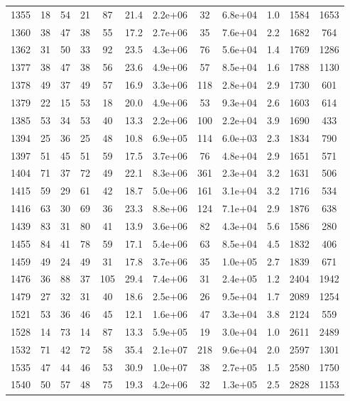 \begin{table}
\begin{tabular}{cccccccccccc}
1355 & 18 & 54 & 21 & 87 & 21.4 & 2.2e+06 & 32 & 6.8e+04 & 1.0 & 1584 & 1653 \\
1360 & 38 & 47 & 38 & 55 & 17.2 & 2.7e+06 & 35 & 7.6e+04 & 2.2 & 1682 & 764 \\
1362 & 31 & 50 & 33 & 92 & 23.5 & 4.3e+06 & 76 & 5.6e+04 & 1.4 & 1769 & 1286 \\
1377 & 38 & 47 & 38 & 56 & 23.6 & 4.9e+06 & 57 & 8.5e+04 & 1.6 & 1788 & 1130 \\
1378 & 49 & 37 & 49 & 57 & 16.9 & 3.3e+06 & 118 & 2.8e+04 & 2.9 & 1730 & 601 \\
1379 & 22 & 15 & 53 & 18 & 20.0 & 4.9e+06 & 53 & 9.3e+04 & 2.6 & 1603 & 614 \\
1385 & 53 & 34 & 53 & 40 & 13.3 & 2.2e+06 & 100 & 2.2e+04 & 3.9 & 1690 & 433 \\
1394 & 25 & 36 & 25 & 48 & 10.8 & 6.9e+05 & 114 & 6.0e+03 & 2.3 & 1834 & 790 \\
1397 & 51 & 45 & 51 & 59 & 17.5 & 3.7e+06 & 76 & 4.8e+04 & 2.9 & 1651 & 571 \\
1404 & 71 & 37 & 72 & 49 & 22.1 & 8.3e+06 & 361 & 2.3e+04 & 3.2 & 1631 & 506 \\
1415 & 59 & 29 & 61 & 42 & 18.7 & 5.0e+06 & 161 & 3.1e+04 & 3.2 & 1716 & 534 \\
1416 & 63 & 30 & 69 & 36 & 23.3 & 8.8e+06 & 124 & 7.1e+04 & 2.9 & 1876 & 638 \\
1439 & 83 & 31 & 80 & 41 & 13.9 & 3.6e+06 & 82 & 4.3e+04 & 5.6 & 1586 & 280 \\
1455 & 84 & 41 & 78 & 59 & 17.1 & 5.4e+06 & 63 & 8.5e+04 & 4.5 & 1832 & 406 \\
1459 & 49 & 24 & 49 & 31 & 17.8 & 3.7e+06 & 35 & 1.0e+05 & 2.7 & 1839 & 671 \\
1476 & 36 & 88 & 37 & 105 & 29.4 & 7.4e+06 & 31 & 2.4e+05 & 1.2 & 2404 & 1942 \\
1479 & 27 & 32 & 31 & 40 & 18.6 & 2.5e+06 & 26 & 9.5e+04 & 1.7 & 2089 & 1254 \\
1521 & 53 & 36 & 46 & 45 & 12.1 & 1.6e+06 & 47 & 3.3e+04 & 3.8 & 2124 & 559 \\
1528 & 14 & 73 & 14 & 87 & 13.3 & 5.9e+05 & 19 & 3.0e+04 & 1.0 & 2611 & 2489 \\
1532 & 71 & 42 & 72 & 58 & 35.4 & 2.1e+07 & 218 & 9.6e+04 & 2.0 & 2597 & 1301 \\
1535 & 47 & 44 & 46 & 53 & 30.9 & 1.0e+07 & 38 & 2.7e+05 & 1.5 & 2580 & 1750 \\
1540 & 50 & 57 & 48 & 75 & 19.3 & 4.2e+06 & 32 & 1.3e+05 & 2.5 & 2828 & 1153 \\

\end{tabular}
\end{table}
